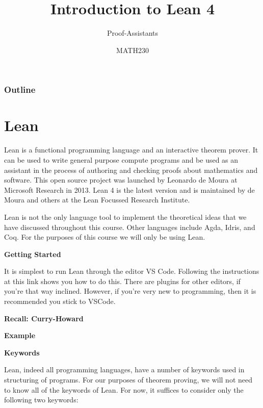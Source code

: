 \documentclass{beamer}
\title{Introduction to Lean 4}
\subtitle{Proof-Assistants}
\author{MATH230}
\institute{School of Mathematics and Statistics \\ University of Canterbury}
\date{}
\theoremstyle{indentDefn} \newtheorem{defn}[]{Definition}
\begin{document}
\begin{frame}

  \titlepage

\end{frame}

\begin{frame}
  \frametitle{Outline}

  \tableofcontents

\end{frame}

\section{Lean}

Lean is a functional programming language and an interactive theorem prover. It can be used to write general purpose compute programs and be used as an assistant in the process of authoring and checking proofs about mathematics and software. This open source project was launched by Leonardo de Moura at Microsoft Research in 2013. Lean 4 is the latest version and is maintained by de Moura and others at the Lean Focussed Research Institute.

Lean is not the only language tool to implement the theoretical ideas that we have discussed throughout this course. Other languages include Agda, Idris, and Coq. For the purposes of this course we will only be using Lean. 

\vfill
\newpage
\textbf{Getting Started}

It is simplest to run Lean through the editor VS Code. Following the instructions at this link shows you how to do this. There are plugins for other editors, if you're that way inclined. However, if you're very new to programming, then it is recommended you stick to VSCode. 

\vfill
\newpage
\textbf{Recall: Curry-Howard}



\vfill
\newpage
\textbf{Example}


\vfill
\newpage
\textbf{Keywords}

Lean, indeed all programming languages, have a number of keywords used in structuring of programs. For our purposes of theorem proving, we will not need to know all of the keywords of Lean. For now, it suffices to consider only the following two keywords: 
\end{document}
